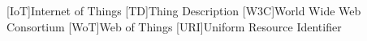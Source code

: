 \documentclass[conference]{IEEEtran}
\theoremstyle{definition}
\begin{document}
\begin{acronym}[ECU]
[IoT]{Internet of Things}
[TD]{Thing Description}
[W3C]{World Wide Web Consortium}
[WoT]{Web of Things}
[URI]{Uniform Resource Identifier}
\end{acronym}

%



\end{document}
